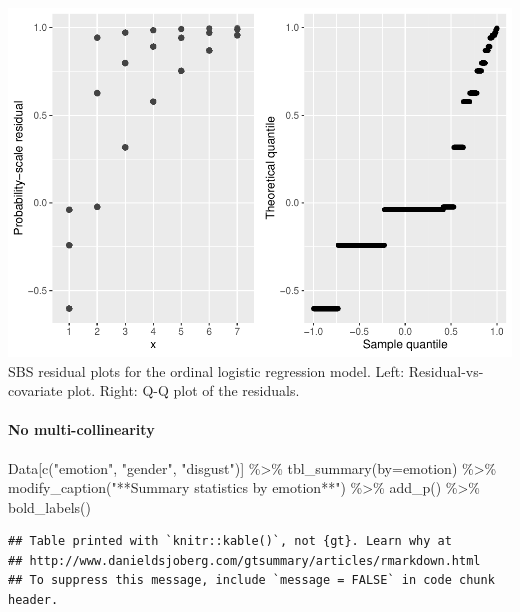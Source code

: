 \documentclass[
]{article}
\newenvironment{Shaded}{\begin{snugshade}}{\end{snugshade}}
\newcommand{\AttributeTok}[1]{\textcolor[rgb]{0.77,0.63,0.00}{#1}}
\newcommand{\FunctionTok}[1]{\textcolor[rgb]{0.00,0.00,0.00}{#1}}
\newcommand{\NormalTok}[1]{#1}
\newcommand{\SpecialCharTok}[1]{\textcolor[rgb]{0.00,0.00,0.00}{#1}}
\newcommand{\StringTok}[1]{\textcolor[rgb]{0.31,0.60,0.02}{#1}}
\begin{document}
\includegraphics{DAP_v4-1-22_files/figure-latex/residual plots-1.pdf}
SBS residual plots for the ordinal logistic regression model. Left:
Residual-vs-covariate plot. Right: Q-Q plot of the residuals.

\hypertarget{no-multi-collinearity}{%
\paragraph{No multi-collinearity}\label{no-multi-collinearity}}

\begin{Shaded}
\begin{Highlighting}[]
\NormalTok{Data[}\FunctionTok{c}\NormalTok{(}\StringTok{"emotion"}\NormalTok{, }\StringTok{"gender"}\NormalTok{, }\StringTok{"disgust"}\NormalTok{)] }\SpecialCharTok{\%\textgreater{}\%}  \FunctionTok{tbl\_summary}\NormalTok{(}\AttributeTok{by=}\NormalTok{emotion)  }\SpecialCharTok{\%\textgreater{}\%} \FunctionTok{modify\_caption}\NormalTok{(}\StringTok{"**Summary statistics by emotion**"}\NormalTok{) }\SpecialCharTok{\%\textgreater{}\%}
  \FunctionTok{add\_p}\NormalTok{() }\SpecialCharTok{\%\textgreater{}\%} \FunctionTok{bold\_labels}\NormalTok{()}
\end{Highlighting}
\end{Shaded}

\begin{verbatim}
## Table printed with `knitr::kable()`, not {gt}. Learn why at
## http://www.danieldsjoberg.com/gtsummary/articles/rmarkdown.html
## To suppress this message, include `message = FALSE` in code chunk header.
\end{verbatim}
\end{document}
